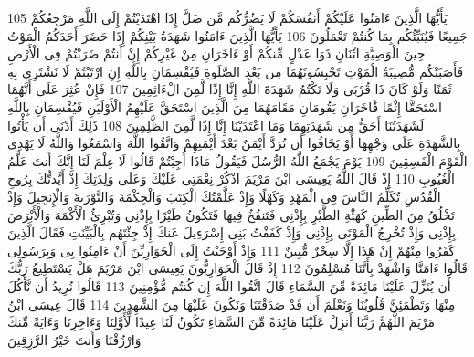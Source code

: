 \documentclass[20pt,a4paper]{article}
\begin{document}
{\tiny\colorbox{cl_aya}{105}} يَأَيُّهَا الَّذِينَ ءَامَنُوا عَلَيْكُمْ أَنفُسَكُمْ لَا يَضُرُّكُم مَّن ضَلَّ إِذَا اهْتَدَيْتُمْ إِلَى اللَّهِ مَرْجِعُكُمْ جَمِيعًا فَيُنَبِّئُكُم بِمَا كُنتُمْ تَعْمَلُونَ
{\tiny\colorbox{cl_aya}{106}} يَأَيُّهَا الَّذِينَ ءَامَنُوا شَهَدَةُ بَيْنِكُمْ إِذَا حَضَرَ أَحَدَكُمُ الْمَوْتُ حِينَ الْوَصِيَّةِ اثْنَانِ ذَوَا عَدْلٍ مِّنكُمْ أَوْ ءَاخَرَانِ مِنْ غَيْرِكُمْ إِنْ أَنتُمْ ضَرَبْتُمْ فِى الْأَرْضِ فَأَصَبَتْكُم مُّصِيبَةُ الْمَوْتِ تَحْبِسُونَهُمَا مِن بَعْدِ الصَّلَوةِ فَيُقْسِمَانِ بِاللَّهِ إِنِ ارْتَبْتُمْ لَا نَشْتَرِى بِهِ ثَمَنًا وَلَوْ كَانَ ذَا قُرْبَى وَلَا نَكْتُمُ شَهَدَةَ اللَّهِ إِنَّا إِذًا لَّمِنَ الْءَاثِمِينَ
{\tiny\colorbox{cl_aya}{107}} فَإِنْ عُثِرَ عَلَى أَنَّهُمَا اسْتَحَقَّا إِثْمًا فََٔاخَرَانِ يَقُومَانِ مَقَامَهُمَا مِنَ الَّذِينَ اسْتَحَقَّ عَلَيْهِمُ الْأَوْلَيَنِ فَيُقْسِمَانِ بِاللَّهِ لَشَهَدَتُنَا أَحَقُّ مِن شَهَدَتِهِمَا وَمَا اعْتَدَيْنَا إِنَّا إِذًا لَّمِنَ الظَّلِمِينَ
{\tiny\colorbox{cl_aya}{108}} ذَلِكَ أَدْنَى أَن يَأْتُوا بِالشَّهَدَةِ عَلَى وَجْهِهَا أَوْ يَخَافُوا أَن تُرَدَّ أَيْمَنٌ بَعْدَ أَيْمَنِهِمْ وَاتَّقُوا اللَّهَ وَاسْمَعُوا وَاللَّهُ لَا يَهْدِى الْقَوْمَ الْفَسِقِينَ
{\tiny\colorbox{cl_aya}{109}} يَوْمَ يَجْمَعُ اللَّهُ الرُّسُلَ فَيَقُولُ مَاذَا أُجِبْتُمْ قَالُوا لَا عِلْمَ لَنَا إِنَّكَ أَنتَ عَلَّمُ الْغُيُوبِ
{\tiny\colorbox{cl_aya}{110}} إِذْ قَالَ اللَّهُ يَعِيسَى ابْنَ مَرْيَمَ اذْكُرْ نِعْمَتِى عَلَيْكَ وَعَلَى وَلِدَتِكَ إِذْ أَيَّدتُّكَ بِرُوحِ الْقُدُسِ تُكَلِّمُ النَّاسَ فِى الْمَهْدِ وَكَهْلًا وَإِذْ عَلَّمْتُكَ الْكِتَبَ وَالْحِكْمَةَ وَالتَّوْرَىةَ وَالْإِنجِيلَ وَإِذْ تَخْلُقُ مِنَ الطِّينِ كَهَئَْةِ الطَّيْرِ بِإِذْنِى فَتَنفُخُ فِيهَا فَتَكُونُ طَيْرًا بِإِذْنِى وَتُبْرِئُ الْأَكْمَهَ وَالْأَبْرَصَ بِإِذْنِى وَإِذْ تُخْرِجُ الْمَوْتَى بِإِذْنِى وَإِذْ كَفَفْتُ بَنِى إِسْرَءِيلَ عَنكَ إِذْ جِئْتَهُم بِالْبَيِّنَتِ فَقَالَ الَّذِينَ كَفَرُوا مِنْهُمْ إِنْ هَذَا إِلَّا سِحْرٌ مُّبِينٌ
{\tiny\colorbox{cl_aya}{111}} وَإِذْ أَوْحَيْتُ إِلَى الْحَوَارِيِّنَ أَنْ ءَامِنُوا بِى وَبِرَسُولِى قَالُوا ءَامَنَّا وَاشْهَدْ بِأَنَّنَا مُسْلِمُونَ
{\tiny\colorbox{cl_aya}{112}} إِذْ قَالَ الْحَوَارِيُّونَ يَعِيسَى ابْنَ مَرْيَمَ هَلْ يَسْتَطِيعُ رَبُّكَ أَن يُنَزِّلَ عَلَيْنَا مَائِدَةً مِّنَ السَّمَاءِ قَالَ اتَّقُوا اللَّهَ إِن كُنتُم مُّؤْمِنِينَ
{\tiny\colorbox{cl_aya}{113}} قَالُوا نُرِيدُ أَن نَّأْكُلَ مِنْهَا وَتَطْمَئِنَّ قُلُوبُنَا وَنَعْلَمَ أَن قَدْ صَدَقْتَنَا وَنَكُونَ عَلَيْهَا مِنَ الشَّهِدِينَ
{\tiny\colorbox{cl_aya}{114}} قَالَ عِيسَى ابْنُ مَرْيَمَ اللَّهُمَّ رَبَّنَا أَنزِلْ عَلَيْنَا مَائِدَةً مِّنَ السَّمَاءِ تَكُونُ لَنَا عِيدًا لِّأَوَّلِنَا وَءَاخِرِنَا وَءَايَةً مِّنكَ وَارْزُقْنَا وَأَنتَ خَيْرُ الرَّزِقِينَ
\end{document}
